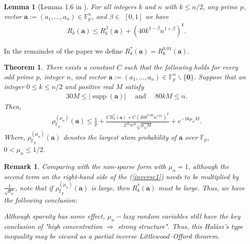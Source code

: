 \documentclass{article}
\numberwithin{equation}{section}
\theoremstyle{plain}
\newtheorem{myrem}{Remark}[section]
\newtheorem{Theorem}{Theorem}[section]
\newtheorem{lemma}{Lemma}[section]
\begin{document}
\begin{lemma}[Lemma 1.6 in \cite{MR4273471}]\label{Ra1}
For all integers $k$ and $n$ with $k \leqslant n / 2$, any prime $p$, vector $\boldsymbol{a}:=\left(a_1, \ldots, a_n\right) \in \mathbb{F}_p^n$, and $\beta \in$ $[0,1]$ we have
\begin{align*}
R_k(\boldsymbol{a}) \leqslant R_k^\beta(\boldsymbol{a})+\left(40 k^{1-\beta} n^{1+\beta}\right)^k.
\end{align*}
\end{lemma}
In the remainder of the paper we define $R_k^*(\boldsymbol{a})=R_k^{0.01}(\boldsymbol{a})$.
\begin{Theorem}\label{Hal}
There exists a constant $C$ such that the following holds for every odd prime $p$, integer $n$, and vector $\boldsymbol{a}:=\left(a_1, \ldots, a_n\right) \in \mathbb{F}_p^n \backslash\{\mathbf{0}\}$. Suppose that an integer $0 \leq k \leq n / 2$ and positive real $M$ satisfy
\begin{align*}
30 M \leq|\operatorname{supp}(\boldsymbol{a})| \quad \text { and } \quad 80 k M \leq n .
\end{align*}
Then,
\begin{align}\label{inverse1}
\rho^{(\mu_{n})}_{\mathbb{F}_p}(\boldsymbol{a}) \leq \frac{1}{p}+\frac{C R_k^*(\boldsymbol{a})+C\left(40 k^{0.99} n^{1.01}\right)^k}{2^{2 k} n^{2 k} \sqrt{\mu_{n} M}}+e^{-16\mu_{n} M} .
\end{align}
Where, $\rho^{(\mu_{n})}_{\mathbb{F}_p}(\boldsymbol{a})$ denotes the largest atom probability of $\boldsymbol{a}$ over $\mathbb{F}_p$, $0<\mu_{n}\leq1/2$.
\end{Theorem}
\begin{myrem}
Comparing with the non-sparse form with $\mu_n=1$, although the second term on the right-hand side of the (\ref{inverse1}) needs to be multiplied by $\frac{1}{\sqrt{\mu_n}}$, note that if $\rho^{(\mu_{n})}_{\mathbb{F}_p}(\boldsymbol{a})$ is large, then $R_k^*(\boldsymbol{a})$ must be large. Thus, we have the following conclusion:
\par
Although sparsity has some effect, $\mu_n-$lazy random variables still have the key conclusion of "high concentration $\Rightarrow$ strong structure". Thus, this Hal\'{a}sz’s type inequality may be viewed as a partial inverse Littlewood–Offord theorem. 
\end{myrem}
\end{document}
